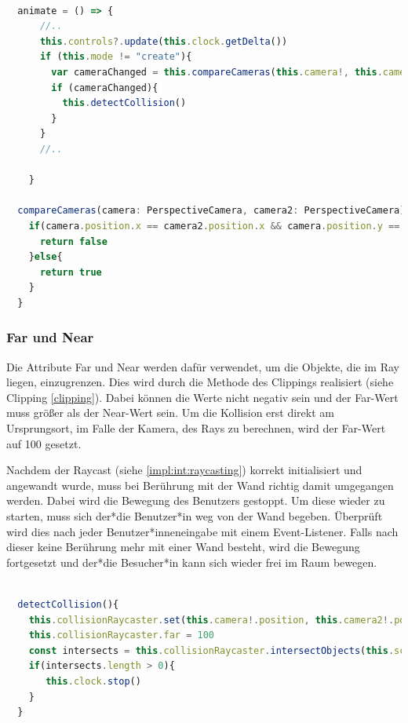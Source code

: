 \begin{lstlisting}[caption={Methode zum vergleichen der Position der Kameras},language=TypeScript,label=lst:impl:compareCameras]
    
  animate = () => {
      //..
      this.controls?.update(this.clock.getDelta())
      if (this.mode != "create"){
        var cameraChanged = this.compareCameras(this.camera!, this.camera2!)
        if (cameraChanged){
          this.detectCollision()
        }
      }
      //..
    
    }

  compareCameras(camera: PerspectiveCamera, camera2: PerspectiveCamera): boolean{
    if(camera.position.x == camera2.position.x && camera.position.y == camera2.position.y){
      return false
    }else{
      return true
    }
  }
\end{lstlisting}

\subsubsection{Far und Near}
Die Attribute Far und Near werden dafür verwendet, um die Objekte, die im Ray liegen, einzugrenzen. Dies wird durch die Methode des Clippings realisiert (siehe Clipping \ref{clipping}). Dabei können die Werte nicht negativ sein und der Far-Wert muss größer als der Near-Wert sein. Um die Kollision erst direkt am Ursprungsort, im Falle der Kamera, des Rays zu berechnen, wird der Far-Wert auf 100 gesetzt.
   	
Nachdem der Raycast (siehe \ref{impl:int:raycasting}) korrekt initialisiert und angewandt wurde, muss bei Berührung mit der Wand richtig damit umgegangen werden. Dabei wird die Bewegung des Benutzers gestoppt. Um diese wieder zu starten, muss sich der*die Benutzer*in weg von der Wand begeben. Überprüft wird dies nach jeder Benutzer*inneneingabe mit einem Event-Listener. Falls nach dieser keine Berührung mehr mit einer Wand besteht, wird die Bewegung fortgesetzt und der*die Besucher*in kann sich wieder frei im Raum bewegen.

\begin{lstlisting}[caption={Methode zum ermitteln einer Kollision mit der Wand},language=TypeScript,label=lst:impl:detectCollision]
    
  detectCollision(){
    this.collisionRaycaster.set(this.camera!.position, this.camera2!.position.normalize())
    this.collisionRaycaster.far = 100
    const intersects = this.collisionRaycaster.intersectObjects(this.scene.children)
    if(intersects.length > 0){
       this.clock.stop()
    }
  }

\end{lstlisting}

